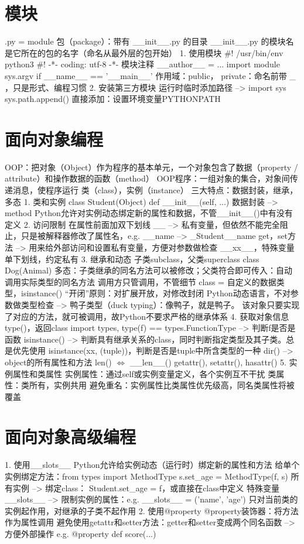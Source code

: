 \documentclass{report}
\begin{document}
\section{模块}
.py = module 
包（package）：带有 __init__.py 的目录
__init__.py 的模块名是它所在的包的名字（命名从最外层的包开始）
1. 使用模块
   #! /usr/bin/env python3
   #! -*- coding: utf-8 -*- 
   模块注释
   __author__ = ...
   import module 
   sys.argv 
   if __name__ == '__main__' 
   作用域：public， private：命名前带 _ ，只是形式、编程习惯
2. 安装第三方模块
   运行时临时添加路径 --> import sys 
                       sys.path.append() 
   直接添加：设置环境变量PYTHONPATH
\section{面向对象编程}
OOP：把对象（Object）作为程序的基本单元，一个对象包含了数据（property / attribute）和操作数据的函数（method）
OOP程序：一组对象的集合，对象间传递消息，使程序运行
类（class），实例（instance）
三大特点：数据封装，继承，多态
1. 类和实例
   class Student(Object)
   def __init__(self, ...)
   数据封装 --> method 
   Python允许对实例动态绑定新的属性和数据，不管__init__()中有没有定义
2. 访问限制
   在属性前面加双下划线 __ --> 私有变量，但依然不能完全阻止，只是被解释器修改了属性名，e.g. __name --> _Student__name 
   get，set方法 --> 用来给外部访问和设置私有变量，方便对参数做检查
   __xx__，特殊变量
   单下划线，约定私有
3. 继承和动态
   子类subclass，父类superclass
   class Dog(Animal)
   多态：子类继承的同名方法可以被修改；父类符合即可传入：自动调用实际类型的同名方法
   调用方只管调用，不管细节
   class = 自定义的数据类型，isinstance()
   “开闭”原则：对扩展开放，对修改封闭
   Python动态语言，不对参数做类型检查 --> 鸭子类型（duck typing）：像鸭子，就是鸭子。
   该对象只要实现了对应的方法，就可被调用，故Python不要求严格的继承体系
4. 获取对象信息
   type()，返回class
   import types, type(f) == types.FunctionType --> 判断f是否是函数 
   isinstance() --> 判断具有继承关系的class，同时判断指定类型及其子类。总是优先使用
   isinstance(xx, (tuple))，判断是否是tuple中所含类型的一种
   dir() --> object的所有属性和方法
   len() $\Leftrightarrow$ __len__() 
   getattr(), setattr(), hasattr() 
5. 实例属性和类属性 
   实例属性：通过self或实例变量定义，各个实例互不干扰 
   类属性：类所有，实例共用 
   避免重名：实例属性比类属性优先级高，同名类属性将被覆盖
\section{面向对象高级编程}
1. 使用__slots__ 
   Python允许给实例动态（运行时）绑定新的属性和方法
   给单个实例绑定方法：from types import MethodType
                    s.set_age = MethodType(f, s)
   所有实例 --> 绑定class： Student.set_age = f，或直接在class中定义 
   特殊变量__slots__ --> 限制实例的属性：e.g. __slots__ = ('name', 'age')
   只对当前类的实例起作用，对继承的子类不起作用 
2. 使用@property 
   @property装饰器：将方法作为属性调用
   避免使用getattr和setter方法：getter和setter变成两个同名函数 --> 方便外部操作
   e.g. @property 
        def score(...)
\end{document}
